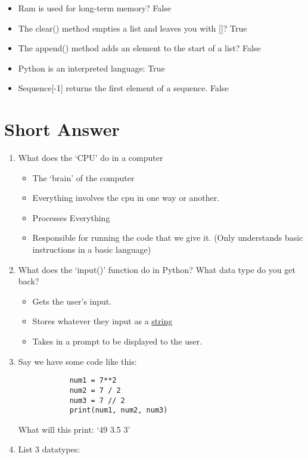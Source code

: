 \documentclass{article}
\begin{document}
    \begin{itemize}
        \item Ram is used for long-term memory? False
        \item The clear() method empties a list and leaves you with []? True
        \item The append() method adds an element to the start of a list? False
        \item Python is an interpreted language: True
        \item Sequence[-1] returns the first element of a sequence. False
    \end{itemize}
    \section*{Short Answer}
    \begin{enumerate}
        \item What does the `CPU' do in a computer
        \begin{itemize}
            \item The `brain' of the computer
            \item Everything involves the cpu in one way or another.
            \item Processes Everything
            \item Responsible for running the code that we give it. (Only understands basic instructions in a basic language)
        \end{itemize}
        \item What does the `input()' function do in Python? What data type do you get back?
        \begin{itemize}
            \item Gets the user's input.
            \item Stores whatever they input as a \underline{string}
            \item Takes in a prompt to be displayed to the user.
        \end{itemize}
        \item Say we have some code like this:\\
        \begin{verbatim}
            num1 = 7**2
            num2 = 7 / 2
            num3 = 7 // 2
            print(num1, num2, num3)
        \end{verbatim}
        What will this print: `49 3.5 3'\\
        \item List 3 datatypes:

\end{enumerate}
\end{document}
